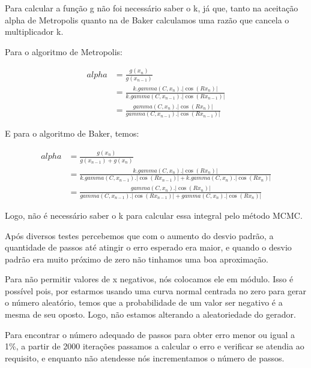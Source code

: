 \documentclass{article}
\begin{document}
\par Para calcular a função g não foi necessário saber o k, já que, tanto na aceitação alpha de Metropolis quanto na de Baker calculamos uma razão que cancela o multiplicador k. 
\par Para o algoritmo de Metropolis:


\begin{equation*} %
    \begin{split}
        alpha & = \frac{g(x_n)}{g(x_{n-1})}\\
            & =  \frac{k.gamma(C,x_n).\left|\cos (Rx_n)\right|}{k.gamma(C,x_{n-1}).\left|\cos (Rx_{n-1})\right|}\\
            & = \frac{gamma(C,x_n).\left|\cos (Rx_n)\right|}{gamma(C,x_{n-1}).\left|\cos (Rx_{n-1})\right|}
    \end{split}
\end{equation*}

\hfill

\par E para o algoritmo de Baker, temos:


\begin{equation*} %
    \begin{split}
        alpha & = \frac{g(x_n)}{g(x_{n-1}) + g(x_{n})}\\
            & =  \frac{k.gamma(C,x_n).\left|\cos (Rx_n)\right|}{k.gamma(C,x_{n-1}).\left|\cos (Rx_{n-1})\right| + k.gamma(C,x_n).\left|\cos (Rx_n)\right|}\\
            & = \frac{gamma(C,x_n).\left|\cos (Rx_n)\right|}{gamma(C,x_{n-1}).\left|\cos (Rx_{n-1})\right| + gamma(C,x_n).\left|\cos (Rx_n)\right|}
    \end{split}
\end{equation*}

\hfill

\par Logo, não é necessário saber o k para calcular essa integral pelo método MCMC.

\hfill

\par Após diversos testes percebemos que com o aumento do desvio padrão, a quantidade de passos até atingir o erro esperado era maior, e quando o desvio padrão era muito próximo de zero não tinhamos uma boa aproximação.

\hfill

\par Para não permitir valores de x negativos, nós colocamos ele em módulo. Isso é possível pois, por estarmos usando uma curva normal centrada no zero para gerar o número aleatório, temos que a probabilidade de um valor ser negativo é a mesma de seu oposto. Logo, não estamos alterando a aleatoriedade do gerador.


\hfill

\par Para encontrar o número adequado de passos para obter erro menor ou igual a 1\%, a partir de 2000 iterações passamos a calcular o erro e verificar se atendia ao requisito, e enquanto não atendesse nós incrementamos o número de passos.
\end{document}
